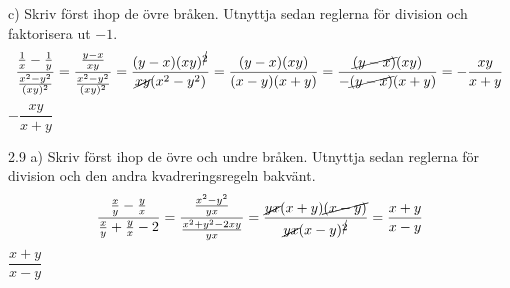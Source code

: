 \begin{task}{c)}
	Skriv först ihop de övre bråken. Utnyttja sedan reglerna för division och faktorisera ut $-1$.
	\[\dfrac{\frac{1}{x}-\frac{1}{y}}{\frac{x^2-y^2}{(xy)^2}}=
	\dfrac{\frac{y-x}{xy}}{\frac{x^2-y^2}{(xy)^2}}=
	\dfrac{(y-x)(xy)^{\cancel{2}}}{\cancel{xy}(x^2-y^2)}=
	\dfrac{(y-x)(xy)}{(x-y)(x+y)}=
	\dfrac{\cancel{(y-x)}(xy)}{-\cancel{(y-x)}(x+y)}=
	-\dfrac{xy}{x+y}\]
	\ans $-\dfrac{xy}{x+y}$
\end{task}

\begin{task}{2.9 a)}
	Skriv först ihop de övre och undre bråken. Utnyttja sedan reglerna för division och den andra kvadreringsregeln bakvänt.
	\[\dfrac{\frac{x}{y}- \frac{y}{x}}{\frac{x}{y}+\frac{y}{x}-2}=
	\dfrac{\frac{x^2-y^2}{yx}}{\frac{x^2+y^2-2xy}{yx}}=
	\dfrac{\cancel{yx}(x+y)\cancel{(x-y)}}{\cancel{yx}(x-y)^{\cancel{2}}}=
	\dfrac{x+y}{x-y}\]
	\ans $\dfrac{x+y}{x-y}$
\end{task}
